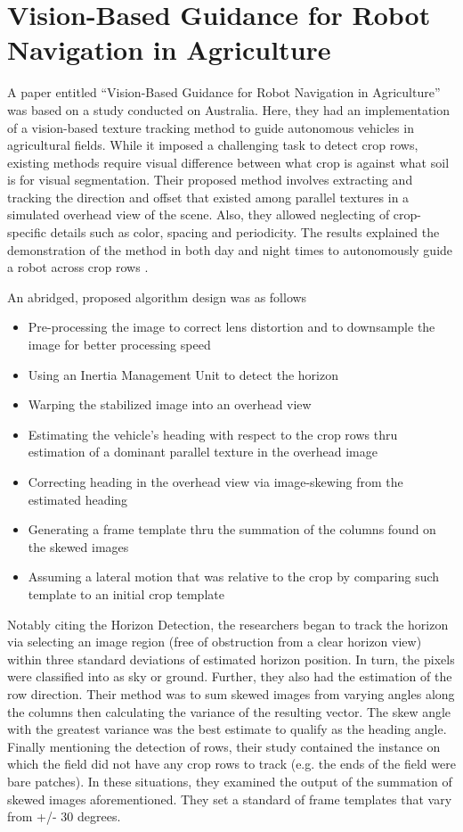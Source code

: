 \section{Vision-Based Guidance for Robot Navigation in Agriculture}

A paper entitled “Vision-Based Guidance for Robot Navigation in Agriculture” was based on a study conducted on Australia. Here, they had an implementation of a vision-based texture tracking method to guide autonomous vehicles in agricultural fields. While it imposed a challenging task to detect crop rows, existing methods require visual difference between what crop is against what soil is for visual segmentation. Their proposed method involves extracting and tracking the direction and offset that existed among parallel textures in a simulated overhead view of the scene. Also, they allowed neglecting of crop-specific details such as color, spacing and periodicity. The results explained the demonstration of the method in both day and night times to autonomously guide a robot across crop rows \cite{English2014}.
 
    An abridged, proposed algorithm design was as follows
\begin{itemize}
\item Pre-processing the image to correct lens distortion and to downsample the image for better processing speed\item Using an Inertia Management Unit to detect the horizon
\item Warping the stabilized image into an overhead view
\item Estimating the vehicle’s heading with respect to the crop rows thru estimation of a dominant parallel texture in the overhead image
\item Correcting heading in the overhead view via image-skewing from the estimated heading
\item Generating a frame template thru the summation of the columns found on the skewed images
\item Assuming a lateral motion that was relative to the crop by comparing such template to an initial crop template
\end{itemize}
\tab Notably citing the Horizon Detection, the researchers began to track the horizon via selecting an image region (free of obstruction from a clear horizon view) within three standard deviations of estimated horizon position. In turn, the pixels were classified into as sky or ground. Further, they also had the estimation of the row direction. Their method was to sum skewed images from varying angles along the columns then calculating the variance of the resulting vector. The skew angle with the greatest variance was the best estimate to qualify as the heading angle. Finally mentioning the detection of rows, their study contained the instance on which the field did not have any crop rows to track (e.g. the ends of the field were bare patches). In these situations, they examined the output of the summation of skewed images aforementioned. They set a standard of frame templates that vary from +/- 30 degrees.

